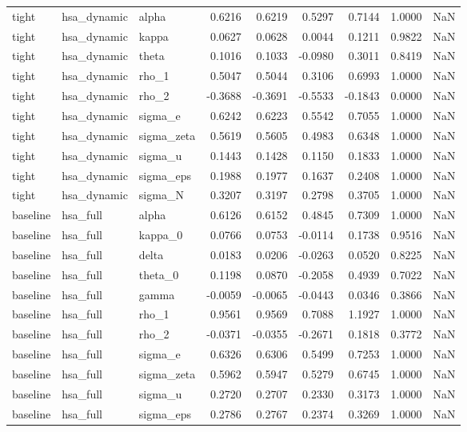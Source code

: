 \begin{tabular}{lllrrrrrl}
tight & hsa\_dynamic & alpha & 0.6216 & 0.6219 & 0.5297 & 0.7144 & 1.0000 & NaN \\
tight & hsa\_dynamic & kappa & 0.0627 & 0.0628 & 0.0044 & 0.1211 & 0.9822 & NaN \\
tight & hsa\_dynamic & theta & 0.1016 & 0.1033 & -0.0980 & 0.3011 & 0.8419 & NaN \\
tight & hsa\_dynamic & rho\_1 & 0.5047 & 0.5044 & 0.3106 & 0.6993 & 1.0000 & NaN \\
tight & hsa\_dynamic & rho\_2 & -0.3688 & -0.3691 & -0.5533 & -0.1843 & 0.0000 & NaN \\
tight & hsa\_dynamic & sigma\_e & 0.6242 & 0.6223 & 0.5542 & 0.7055 & 1.0000 & NaN \\
tight & hsa\_dynamic & sigma\_zeta & 0.5619 & 0.5605 & 0.4983 & 0.6348 & 1.0000 & NaN \\
tight & hsa\_dynamic & sigma\_u & 0.1443 & 0.1428 & 0.1150 & 0.1833 & 1.0000 & NaN \\
tight & hsa\_dynamic & sigma\_eps & 0.1988 & 0.1977 & 0.1637 & 0.2408 & 1.0000 & NaN \\
tight & hsa\_dynamic & sigma\_N & 0.3207 & 0.3197 & 0.2798 & 0.3705 & 1.0000 & NaN \\
baseline & hsa\_full & alpha & 0.6126 & 0.6152 & 0.4845 & 0.7309 & 1.0000 & NaN \\
baseline & hsa\_full & kappa\_0 & 0.0766 & 0.0753 & -0.0114 & 0.1738 & 0.9516 & NaN \\
baseline & hsa\_full & delta & 0.0183 & 0.0206 & -0.0263 & 0.0520 & 0.8225 & NaN \\
baseline & hsa\_full & theta\_0 & 0.1198 & 0.0870 & -0.2058 & 0.4939 & 0.7022 & NaN \\
baseline & hsa\_full & gamma & -0.0059 & -0.0065 & -0.0443 & 0.0346 & 0.3866 & NaN \\
baseline & hsa\_full & rho\_1 & 0.9561 & 0.9569 & 0.7088 & 1.1927 & 1.0000 & NaN \\
baseline & hsa\_full & rho\_2 & -0.0371 & -0.0355 & -0.2671 & 0.1818 & 0.3772 & NaN \\
baseline & hsa\_full & sigma\_e & 0.6326 & 0.6306 & 0.5499 & 0.7253 & 1.0000 & NaN \\
baseline & hsa\_full & sigma\_zeta & 0.5962 & 0.5947 & 0.5279 & 0.6745 & 1.0000 & NaN \\
baseline & hsa\_full & sigma\_u & 0.2720 & 0.2707 & 0.2330 & 0.3173 & 1.0000 & NaN \\
baseline & hsa\_full & sigma\_eps & 0.2786 & 0.2767 & 0.2374 & 0.3269 & 1.0000 & NaN \\

\end{tabular}
